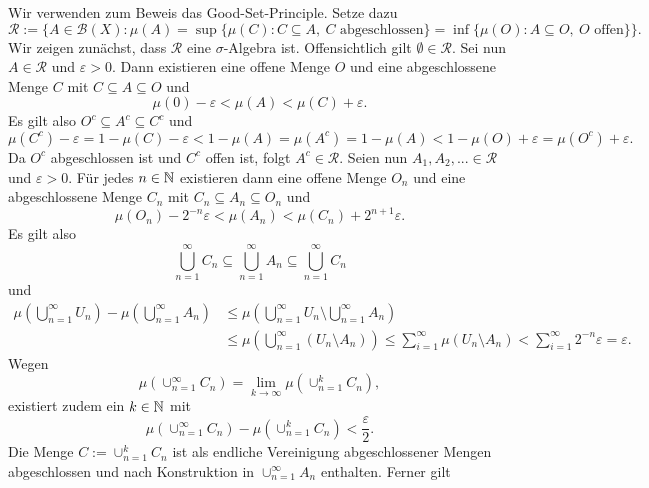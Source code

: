 \begin{proof*}
    Wir verwenden zum Beweis das Good-Set-Principle. Setze dazu
    $$
        \mathcal{R}:=\big\{A \in \mathcal{B}(X):  \mu(A) = \sup\{\mu(C): C \subseteq A, \ C \text{ abgeschlossen}\} =\inf\{\mu(O): A \subseteq O, \ O \text{ offen}\} \big\}.
    $$
    Wir zeigen zunächst, dass $\mathcal{R}$ eine $\sigma$-Algebra ist. Offensichtlich gilt $\emptyset \in \mathcal{R}$. Sei nun $A \in \mathcal{R}$ und $\varepsilon > 0$. 
    Dann existieren eine offene Menge $O$ und eine abgeschlossene Menge $C$ mit $C \subseteq A \subseteq O$ und 
    $$
        \mu(0) - \varepsilon < \mu(A) < \mu(C) + \varepsilon.
    $$
    Es gilt also $O^c \subseteq A^c \subseteq C^c$ und 
    $$
        \mu(C^c) - \varepsilon = 1 - \mu(C) - \varepsilon < 1 - \mu(A) = \mu(A^c) = 1 - \mu(A) < 1 - \mu(O) + \varepsilon = \mu(O^c) + \varepsilon. 
    $$
    Da $O^c$ abgeschlossen ist und $C^c$ offen ist, folgt $A^c \in \mathcal{R}$. 
    \newline 
    Seien nun $A_1, A_2,... \in \mathcal{R}$ und $\varepsilon > 0$. Für jedes $n \in \mathbb{N}$ existieren dann eine offene Menge $O_n$ und eine abgeschlossene Menge $C_n$ mit $C_n \subseteq A_n \subseteq O_n$ und 
    $$
        \mu(O_n) - 2^{-n}\varepsilon < \mu(A_n) < \mu(C_n) + 2^{n+1}\varepsilon.
    $$
    Es gilt also
    $$
        \bigcup_{n = 1}^{\infty} C_n \subseteq \bigcup_{n=1}^{\infty} A_n \subseteq \bigcup_{n=1}^{\infty}C_n
    $$
    und 
    \begin{align}
        \mu\left(\bigcup_{n =1}^{\infty}U_n\right) - \mu\left(\bigcup_{n=1}^{\infty}A_n\right) &\leq \mu\left(\bigcup_{n =1}^{\infty}U_n\setminus \bigcup_{n =1}^{\infty} A_n\right) \nonumber \\\
                                                                                &\leq \mu\left(\bigcup_{n =1}^{\infty}(U_n\setminus A_n)\right) 
                                                                                \leq \sum_{i=1}^{\infty}\mu(U_n\setminus A_n)
                                                                                < \sum_{i=1}^{\infty}2^{-n}\varepsilon = \varepsilon. 
    \end{align}
    Wegen 
    $$
    \mu(\cup_{n = 1}^{\infty}C_n) = \lim_{k \to \infty}\mu(\cup_{n=1}^kC_n),
    $$
    existiert zudem ein $k \in \mathbb{N}$ mit 
    $$
    \mu(\cup_{n=1}^{\infty}C_n) - \mu(\cup_{n=1}^kC_n) < \frac{\varepsilon}{2}.
    $$ 
    Die Menge $C:= \cup_{n=1}^kC_n$ ist als endliche Vereinigung abgeschlossener Mengen abgeschlossen und nach Konstruktion in $\cup_{n=1}^{\infty}A_n$ enthalten. Ferner gilt 

\end{proof*}
